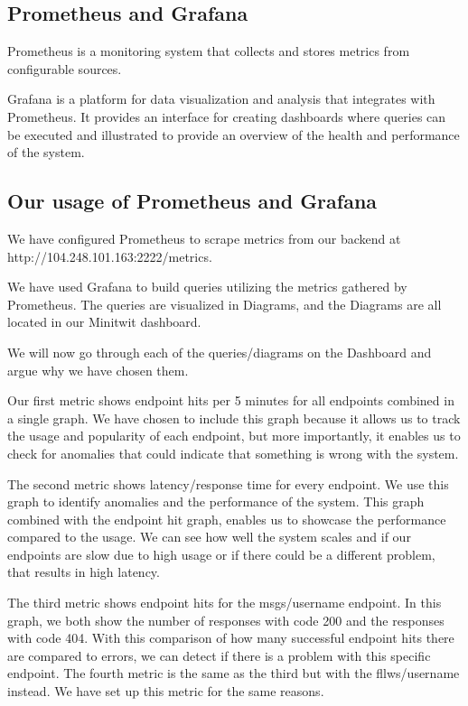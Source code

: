 \subsection{Prometheus and Grafana}
Prometheus is a monitoring system that collects and stores metrics from configurable sources.

Grafana is a platform for data visualization and analysis that integrates with Prometheus. It provides an interface for creating dashboards where queries can be executed and illustrated to provide an overview of the health and performance of the system.

\subsection{Our usage of Prometheus and Grafana} %
We have configured Prometheus to scrape metrics from our backend at http://104.248.101.163:2222/metrics. \newline

\noindent We have used Grafana to build queries utilizing the metrics gathered by Prometheus. The queries are visualized in Diagrams, and the Diagrams are all located in our Minitwit dashboard. \newline

\noindent We will now go through each of the queries/diagrams on the Dashboard and argue why we have chosen them. \newline

Our first metric shows endpoint hits per 5 minutes for all endpoints combined in a single graph. We have chosen to include this graph because it allows us to track the usage and popularity of each endpoint, but more importantly, it enables us to check for anomalies that could indicate that something is wrong with the system. \newline

\noindent The second metric shows latency/response time for every endpoint. We use this graph to identify anomalies and the performance of the system. This graph combined with the endpoint hit graph, enables us to showcase the performance compared to the usage. We can see how well the system scales and if our endpoints are slow due to high usage or if there could be a different problem, that results in high latency. \newline

\noindent The third metric shows endpoint hits for the msgs/username endpoint. In this graph, we both show the number of responses with code 200 and the responses with code 404. With this comparison of how many successful endpoint hits there are compared to errors, we can detect if there is a problem with this specific endpoint.
The fourth metric is the same as the third but with the fllws/username instead. We have set up this metric for the same reasons. \newline

